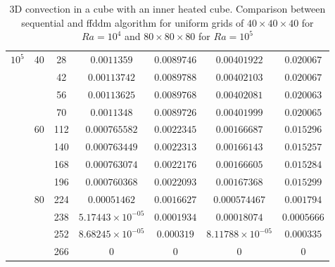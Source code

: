 \begin{table}[!h]
\begin{center}
\begin{tabular}{|*{7}{c|}}
			\multirow{12}{*}{$10^5$}& \multirow{4}{*}{40} & 28 & $0.0011359$ & $0.0089746$ & $ 0.00401922 $ & $0.020067$ \\%
			\cline{3-7}
			& & 42 & $0.00113742$ & $0.0089788$ & $ 0.00402103 $ & $0.020067$  \\ \cline{3-7} %
			& & 56 & $0.00113625$ & $0.0089768$ & $ 0.00402081 $ & $0.020063$   \\ \cline{3-7}%
			& & 70 & $0.0011348$ & $0.0089726$ & $ 0.00401999 $ & $0.020065$  \\ \cline{2-7} %
			 & \multirow{4}{*}{60} & 112 & $0.000765582$ & $0.0022345$ & $ 0.00166687 $ & $0.015296$ \\%
			\cline{3-7}
			& & 140 & $0.000763449$ & $0.0022313$ & $ 0.00166143 $ & $0.015257$ \\ \cline{3-7} %
			& & 168 & $0.000763074$ & $0.0022176$ & $ 0.00166605 $ & $0.015284$  \\ \cline{3-7} %
			& & 196 & $0.000760368$ & $0.0022093$ & $ 0.00167368 $ & $0.015299$ \\ \cline{2-7} 
			 & \multirow{4}{*}{80} & 224 & $0.00051462$ & $0.0016627$ & $ 0.000574467 $ & $0.001794$ \\%
			\cline{3-7}
			& & 238 & $5.17443 \times 10^{-05}$ & $0.0001934$ & $ 0.00018074 $ & $0.0005666$ \\ \cline{3-7} %
			& & 252 & $8.68245 \times 10^{-05}$ & $0.000319$ & $ 8.11788 \times 10^{-05} $ & $0.000335$  \\ \cline{3-7} %
			& & 266 & $0$ & $0$ & $ 0 $ & $0$ \\ \hline 

		\end{tabular}
	\end{center}
	\caption {3D convection in a cube with an inner heated cube. Comparison between sequential and ffddm algorithm for uniform grids of $40 \times 40 \times 40$ for $Ra = 10^4$ and $80 \times 80 \times 80$ for $Ra = 10^5$}
	\label{tab-T2}
\end{table}

